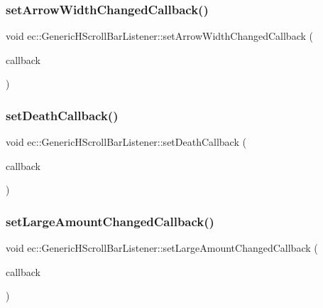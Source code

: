 \subsubsection{\texorpdfstring{set\+Arrow\+Width\+Changed\+Callback()}{setArrowWidthChangedCallback()}}
{\footnotesize\ttfamily void ec\+::\+Generic\+H\+Scroll\+Bar\+Listener\+::set\+Arrow\+Width\+Changed\+Callback (\begin{DoxyParamCaption}\item[{const \mbox{\hyperlink{classec_1_1_generic_h_scroll_bar_listener_a5f6e07b1012f51b6ef9be3d9ac81e121}{Arrow\+Width\+Changed\+\_\+\+Callback}} \&}]{callback }\end{DoxyParamCaption})}

\mbox{\label{classec_1_1_generic_h_scroll_bar_listener_a561a6e1f4c7ddb99eb87d7ec692f933d}} 
\subsubsection{\texorpdfstring{set\+Death\+Callback()}{setDeathCallback()}}
{\footnotesize\ttfamily void ec\+::\+Generic\+H\+Scroll\+Bar\+Listener\+::set\+Death\+Callback (\begin{DoxyParamCaption}\item[{const \mbox{\hyperlink{classec_1_1_generic_h_scroll_bar_listener_a20ad93a508cb41b9bd1f2de9f470d617}{Death\+\_\+\+Callback}} \&}]{callback }\end{DoxyParamCaption})}

\mbox{\label{classec_1_1_generic_h_scroll_bar_listener_ad364e01abb00b07d0bca10e788e8340f}} 
\subsubsection{\texorpdfstring{set\+Large\+Amount\+Changed\+Callback()}{setLargeAmountChangedCallback()}}
{\footnotesize\ttfamily void ec\+::\+Generic\+H\+Scroll\+Bar\+Listener\+::set\+Large\+Amount\+Changed\+Callback (\begin{DoxyParamCaption}\item[{const \mbox{\hyperlink{classec_1_1_generic_h_scroll_bar_listener_a668ece57152ae7212f4e7b68a202da04}{Large\+Amount\+Changed\+\_\+\+Callback}} \&}]{callback }\end{DoxyParamCaption})}

